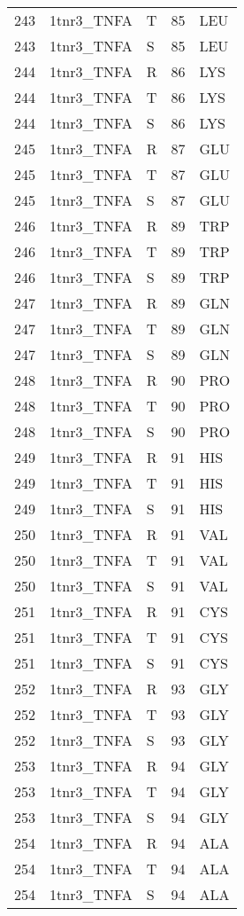 \begin{longtable}[l]{l|l|l|l|l}
	243 & 1tnr3_TNFA & T & 85 & LEU \\
	243 & 1tnr3_TNFA & S & 85 & LEU \\
	244 & 1tnr3_TNFA & R & 86 & LYS \\
	244 & 1tnr3_TNFA & T & 86 & LYS \\
	244 & 1tnr3_TNFA & S & 86 & LYS \\
	245 & 1tnr3_TNFA & R & 87 & GLU \\
	245 & 1tnr3_TNFA & T & 87 & GLU \\
	245 & 1tnr3_TNFA & S & 87 & GLU \\
	246 & 1tnr3_TNFA & R & 89 & TRP \\
	246 & 1tnr3_TNFA & T & 89 & TRP \\
	246 & 1tnr3_TNFA & S & 89 & TRP \\
	247 & 1tnr3_TNFA & R & 89 & GLN \\
	247 & 1tnr3_TNFA & T & 89 & GLN \\
	247 & 1tnr3_TNFA & S & 89 & GLN \\
	248 & 1tnr3_TNFA & R & 90 & PRO \\
	248 & 1tnr3_TNFA & T & 90 & PRO \\
	248 & 1tnr3_TNFA & S & 90 & PRO \\
	249 & 1tnr3_TNFA & R & 91 & HIS \\
	249 & 1tnr3_TNFA & T & 91 & HIS \\
	249 & 1tnr3_TNFA & S & 91 & HIS \\
	250 & 1tnr3_TNFA & R & 91 & VAL \\
	250 & 1tnr3_TNFA & T & 91 & VAL \\
	250 & 1tnr3_TNFA & S & 91 & VAL \\
	251 & 1tnr3_TNFA & R & 91 & CYS \\
	251 & 1tnr3_TNFA & T & 91 & CYS \\
	251 & 1tnr3_TNFA & S & 91 & CYS \\
	252 & 1tnr3_TNFA & R & 93 & GLY \\
	252 & 1tnr3_TNFA & T & 93 & GLY \\
	252 & 1tnr3_TNFA & S & 93 & GLY \\
	253 & 1tnr3_TNFA & R & 94 & GLY \\
	253 & 1tnr3_TNFA & T & 94 & GLY \\
	253 & 1tnr3_TNFA & S & 94 & GLY \\
	254 & 1tnr3_TNFA & R & 94 & ALA \\
	254 & 1tnr3_TNFA & T & 94 & ALA \\
	254 & 1tnr3_TNFA & S & 94 & ALA \\

\end{longtable}
